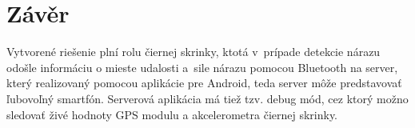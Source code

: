 \documentclass[a4paper,11pt,titlepage]{article}
\begin{document}
\section{Závěr}

Vytvorené riešenie plní rolu čiernej skrinky, ktotá v~prípade detekcie nárazu odošle
informáciu o mieste udalosti a~sile nárazu pomocou Bluetooth na server, který realizovaný pomocou aplikácie pre Android, teda server môže predstavovať ľubovoľný smartfón. Serverová aplikácia má tiež tzv. debug mód, cez ktorý možno sledovať živé hodnoty GPS modulu a akcelerometra čiernej skrinky.
\end{document}
